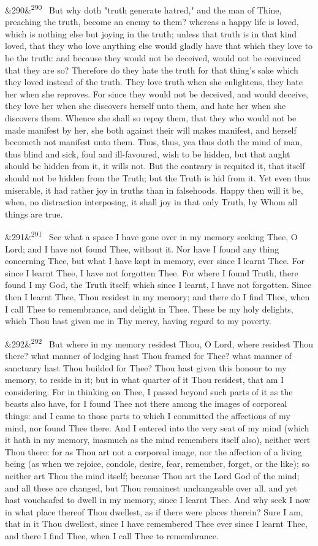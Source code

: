 \documentclass[12pt]{article}
\newcommand{\para}[1][]{\par\noindent\ifx&#1&\else\textsuperscript{\footnotesize #1}~\fi}
\begin{document}
\para[290] But why doth "truth generate hatred," and the man of Thine, preaching the truth, become an enemy to them? whereas a happy life is loved, which is nothing else but joying in the truth; unless that truth is in that kind loved, that they who love anything else would gladly have that which they love to be the truth: and because they would not be deceived, would not be convinced that they are so? Therefore do they hate the truth for that thing's sake which they loved instead of the truth. They love truth when she enlightens, they hate her when she reproves. For since they would not be deceived, and would deceive, they love her when she discovers herself unto them, and hate her when she discovers them. Whence she shall so repay them, that they who would not be made manifest by her, she both against their will makes manifest, and herself becometh not manifest unto them. Thus, thus, yea thus doth the mind of man, thus blind and sick, foul and ill-favoured, wish to be hidden, but that aught should be hidden from it, it wills not. But the contrary is requited it, that itself should not be hidden from the Truth; but the Truth is hid from it. Yet even thus miserable, it had rather joy in truths than in falsehoods. Happy then will it be, when, no distraction interposing, it shall joy in that only Truth, by Whom all things are true.

\para[291] See what a space I have gone over in my memory seeking Thee, O Lord; and I have not found Thee, without it. Nor have I found any thing concerning Thee, but what I have kept in memory, ever since I learnt Thee. For since I learnt Thee, I have not forgotten Thee. For where I found Truth, there found I my God, the Truth itself; which since I learnt, I have not forgotten. Since then I learnt Thee, Thou residest in my memory; and there do I find Thee, when I call Thee to remembrance, and delight in Thee. These be my holy delights, which Thou hast given me in Thy mercy, having regard to my poverty.

\para[292] But where in my memory residest Thou, O Lord, where residest Thou there? what manner of lodging hast Thou framed for Thee? what manner of sanctuary hast Thou builded for Thee? Thou hast given this honour to my memory, to reside in it; but in what quarter of it Thou residest, that am I considering. For in thinking on Thee, I passed beyond such parts of it as the beasts also have, for I found Thee not there among the images of corporeal things: and I came to those parts to which I committed the affections of my mind, nor found Thee there. And I entered into the very seat of my mind (which it hath in my memory, inasmuch as the mind remembers itself also), neither wert Thou there: for as Thou art not a corporeal image, nor the affection of a living being (as when we rejoice, condole, desire, fear, remember, forget, or the like); so neither art Thou the mind itself; because Thou art the Lord God of the mind; and all these are changed, but Thou remainest unchangeable over all, and yet hast vouchsafed to dwell in my memory, since I learnt Thee. And why seek I now in what place thereof Thou dwellest, as if there were places therein? Sure I am, that in it Thou dwellest, since I have remembered Thee ever since I learnt Thee, and there I find Thee, when I call Thee to remembrance.
\end{document}
